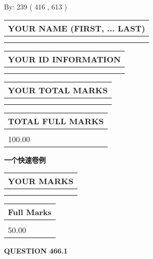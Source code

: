 \documentclass{ctexart}
\begin{document}
   
\hspace{1.0in} By: 
 239 ( 416 ,  613 )
   
   
   
   
\newpage 
\setcounter{page}{ 
   466001 } 
   
   
   
   
\noindent\begin{tabular}{|l|}
\hline
YOUR NAME (FIRST, ... LAST)  \\
\hline
 \\ 
 \\ 
\hline
\end{tabular}
\hspace{0.05in} \begin{tabular}{|l|}
\hline
 YOUR   ID   INFORMATION  \\
\hline
 \\ 
 \\ 
\hline
\end{tabular}
   
   
\vspace{0.2in}\noindent\begin{tabular}{|l|}
\hline
YOUR TOTAL MARKS  \\
\hline
 \\ 
 \\ 
\hline
\end{tabular}
\hspace{0.05in} \begin{tabular}{|l|}
\hline
TOTAL FULL MARKS  \\
\hline
 \\ 
100.00 \\
\hline
\end{tabular}
   
   
 \vspace{0.2in}
{\LARGE {\textbf{ 一个快速卷例}}}
   
   
  
\vspace{0.2in}
  
\noindent\begin{tabular}{|l|}
\hline
 YOUR MARKS  \\
\hline
 \\ 
 \\ 
\hline
\end{tabular}
\hspace{0.05in} \begin{tabular}{|l|}
\hline
 Full Marks  \\
\hline
 \\ 
50.00 \\
\hline
\end{tabular}
{\textbf{\Large{QUESTION
466.1 
}}}
  
\end{document}
